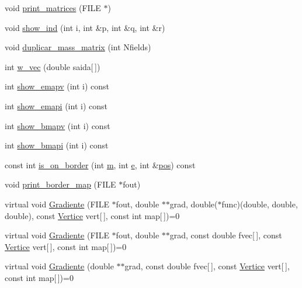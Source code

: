 \begin{DoxyCompactItemize}
\item 
void \hyperlink{classStdel_a319e6a16011b22e12028a841b7686f03}{print\+\_\+matrices} (F\+I\+LE $\ast$)
\item 
void \hyperlink{classStdel_a20afd536025caf1aad1c4e3f41fcb866}{show\+\_\+ind} (int i, int \&p, int \&q, int \&r)
\item 
void \hyperlink{classStdel_a922b779be1f8f12b7a5535ab529bff64}{duplicar\+\_\+mass\+\_\+matrix} (int Nfields)
\item 
int \hyperlink{classStdel_a395c8d7d7890a9efdea23932fa22b420}{w\+\_\+vec} (double saida\mbox{[}$\,$\mbox{]})
\item 
int \hyperlink{classStdel_ad474ffc52b051ae8317b3fdb583c4c98}{show\+\_\+emapv} (int i) const
\item 
int \hyperlink{classStdel_aca7fb885191a952c013e930521a42213}{show\+\_\+emapi} (int i) const
\item 
int \hyperlink{classStdel_ac8787dabfb1d767b89e39806522c1161}{show\+\_\+bmapv} (int i) const
\item 
int \hyperlink{classStdel_ad3a0646ad7ec2567e46da36285dee331}{show\+\_\+bmapi} (int i) const
\item 
const int \hyperlink{classStdel_abb022f0ad81707e11e3a3091d2d87c46}{is\+\_\+on\+\_\+border} (int \hyperlink{DG__EI__Header_8h_a742204794ea328ba293fe59cec79b990}{m}, int \hyperlink{DG__EI__Header_8h_ab1ff01ebd410ddf016a3c7bbe9d98944}{e}, int \&\hyperlink{DG__EI__Header_8h_a1910d262855b71da353ed0d07a6c7823}{pos}) const
\item 
void \hyperlink{classStdel_a9a0c69dca7564f6ca4aa4f3c9864ea01}{print\+\_\+border\+\_\+map} (F\+I\+LE $\ast$fout)
\item 
virtual void \hyperlink{classStdel_af3e65d1ad0d59ded925a3f5a9d0fb100}{Gradiente} (F\+I\+LE $\ast$fout, double $\ast$$\ast$grad, double($\ast$func)(double, double, double), const \hyperlink{structVertice}{Vertice} vert\mbox{[}$\,$\mbox{]}, const int map\mbox{[}$\,$\mbox{]})=0
\item 
virtual void \hyperlink{classStdel_abf44e457d99e8c559c14cb1f7423da12}{Gradiente} (F\+I\+LE $\ast$fout, double $\ast$$\ast$grad, const double fvec\mbox{[}$\,$\mbox{]}, const \hyperlink{structVertice}{Vertice} vert\mbox{[}$\,$\mbox{]}, const int map\mbox{[}$\,$\mbox{]})=0
\item 
virtual void \hyperlink{classStdel_aec200dfb0b00bebf70a1d845675eeafd}{Gradiente} (double $\ast$$\ast$grad, const double fvec\mbox{[}$\,$\mbox{]}, const \hyperlink{structVertice}{Vertice} vert\mbox{[}$\,$\mbox{]}, const int map\mbox{[}$\,$\mbox{]})=0
\end{DoxyCompactItemize}
